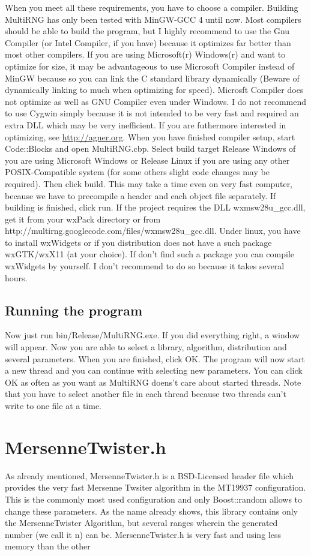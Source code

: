 \documentclass{scrartcl}
\begin{document}
When you meet all these requirements, you have to choose a compiler. Building MultiRNG has only been tested with MinGW-GCC 4 until now. Most compilers should be able to build the program, but I highly recommend to use the Gnu Compiler (or Intel Compiler, if you have) because it optimizes far better than most other compilers. If you are using Microsoft(r) Windows(r) and want to optimize for size, it may be advantageous to use Microsoft Compiler instead of MinGW because so you can link the C standard library dynamically (Beware of dynamically linking to much when optimizing for speed). Microsft Compiler does not optimize as well as GNU Compiler even under Windows. I do not recommend to use Cygwin simply because it is not intended to be very fast and required an extra DLL which may be very inefficient. If you are futhermore interested in optimizing, see \url{http://agner.org}.\newline
When you have finished compiler setup, start Code::Blocks and open MultiRNG.cbp. Select build target Release Windows of you are using Microsoft Windows or Release Linux if you are using any other POSIX-Compatible system (for some others slight code changes may be required). Then click build. This may take a time even on very fast computer, because we have to precompile a header and each object file separately. If building is finished, click run. If the project requires the DLL wxmsw28u\_gcc.dll, get it from your wxPack directory or from http://multirng.googlecode.com/files/wxmsw28u\_gcc.dll. Under linux, you have to install wxWidgets or if you distribution does not have a such package wxGTK/wxX11 (at your choice). If don't find such a package you can compile wxWidgets by yourself. I don't recommend to do so because it takes several hours.
\subsection{Running the program}
Now just run bin/Release/MultiRNG.exe. If you did everything right, a window will appear. Now you are able to select a library, algorithm, distribution and several parameters. When you are finished, click OK. The program will now start a new thread and you can continue with selecting new parameters. You can click OK as often as you want as MultiRNG doens't care about started threads. Note that you have to select another file in each thread because two threads can't write to one file at a time. 
\section{MersenneTwister.h}
As already mentioned, MersenneTwister.h is a BSD-Licensed header file which provides the very fast Mersenne Twsiter algorithm in the MT19937 configuration. This is the commonly most used configuration and only Boost::random allows to change these parameters. As the name already shows, this library contains only the MersenneTwister Algorithm, but several ranges wherein the generated number (we call it n) can be. MersenneTwister.h is very fast and using less memory than the other 
\end{document}
